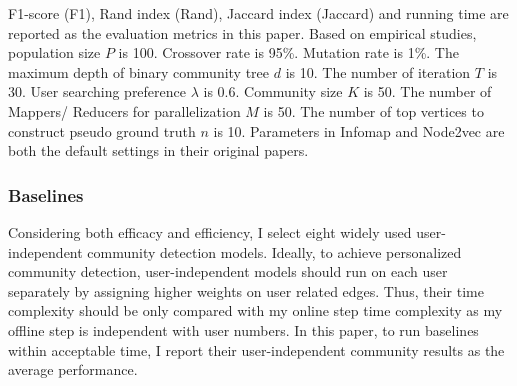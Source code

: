 F1-score (F1), Rand index (Rand), Jaccard index (Jaccard) and running time are reported as the evaluation metrics in this paper. Based on empirical studies, population size $P$ is 100. Crossover rate is 95\%. Mutation rate is 1\%. The maximum depth of binary community tree $d$ is 10. The number of iteration $T$ is 30. User searching preference $\lambda$ is 0.6. Community size $K$ is 50. The number of Mappers/ Reducers for parallelization $M$ is 50. The number of top vertices to construct pseudo ground truth $n$ is 10. Parameters in Infomap and Node2vec are both the default settings in their original papers. 

\subsubsection{Baselines} 

Considering both efficacy and efficiency, I select eight widely used user-independent community detection models. Ideally, to achieve personalized community detection, user-independent models should run on each user separately by assigning higher weights on user related edges. Thus, their time complexity should be only compared with my online step time complexity as my offline step is independent with user numbers. In this paper, to run baselines within acceptable time, I report their user-independent community results as the average performance. 

